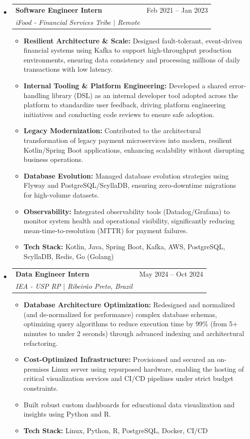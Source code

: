 \documentclass[letterpaper,11pt]{article}
\makeatletter
\newcommand{\resumeItem}[1]{
  \item\small{#1}
}
\newcommand{\resumeSubheading}[4]{
  \vspace{1pt}\item
    \begin{tabular*}{0.97\textwidth}[t]{l@{\extracolsep{\fill}}r}
      \textbf{#1} & #2 \\
      \textit{#3} & \textit{#4} \\
    \end{tabular*}\vspace{-4pt}
}
\makeatother
\begin{document}
\begin{itemize}[leftmargin=0.15in, label={}]
    \resumeSubheading
        {Software Engineer Intern}{Feb 2021 -- Jan 2023}
        {iFood - Financial Services Tribe $|$ Remote}{}
        \begin{itemize}[leftmargin=0.25in, label=\textbullet, itemsep=2pt]
            \resumeItem{\textbf{Resilient Architecture \& Scale:} Designed fault-tolerant, event-driven financial systems using Kafka to support high-throughput production environments, ensuring data consistency and processing millions of daily transactions with low latency.}
            \resumeItem{\textbf{Internal Tooling \& Platform Engineering:} Developed a shared error-handling library (DSL) as an internal developer tool adopted across the platform to standardize user feedback, driving platform engineering initiatives and conducting code reviews to ensure safe adoption.}
            \resumeItem{\textbf{Legacy Modernization:} Contributed to the architectural transformation of legacy payment microservices into modern, resilient Kotlin/Spring Boot applications, enhancing scalability without disrupting business operations.}
            \resumeItem{\textbf{Database Evolution:} Managed database evolution strategies using Flyway and PostgreSQL/ScyllaDB, ensuring zero-downtime migrations for high-volume datasets.}
            \resumeItem{\textbf{Observability:} Integrated observability tools (Datadog/Grafana) to monitor system health and operational visibility, significantly reducing mean-time-to-resolution (MTTR) for payment failures.}
            \resumeItem{\textbf{Tech Stack:} Kotlin, Java, Spring Boot, Kafka, AWS, PostgreSQL, ScyllaDB, Redis, Go (Golang)}
        \end{itemize}
\iffalse
    \resumeSubheading
        {Data Engineer Intern}{May 2024 -- Oct 2024}
        {IEA - USP RP $|$ Ribeirão Preto, Brazil}{}
        \begin{itemize}[leftmargin=0.25in, label=\textbullet, itemsep=2pt]
            \resumeItem{\textbf{Database Architecture Optimization:} Redesigned and normalized (and de-normalized for performance) complex database schemas, optimizing query algorithms to reduce execution time by 99\% (from 5+ minutes to under 2 seconds) through advanced indexing and architectural refactoring.}
            \resumeItem{\textbf{Cost-Optimized Infrastructure:} Provisioned and secured an on-premises Linux server using repurposed hardware, enabling the hosting of critical visualization services and CI/CD pipelines under strict budget constraints.}
            \resumeItem{Built robust custom dashboards for educational data visualization and insights using Python and R.}
            \resumeItem{\textbf{Tech Stack:} Linux, Python, R, PostgreSQL, Docker, CI/CD}
        \end{itemize}


\end{itemize}
\end{document}
